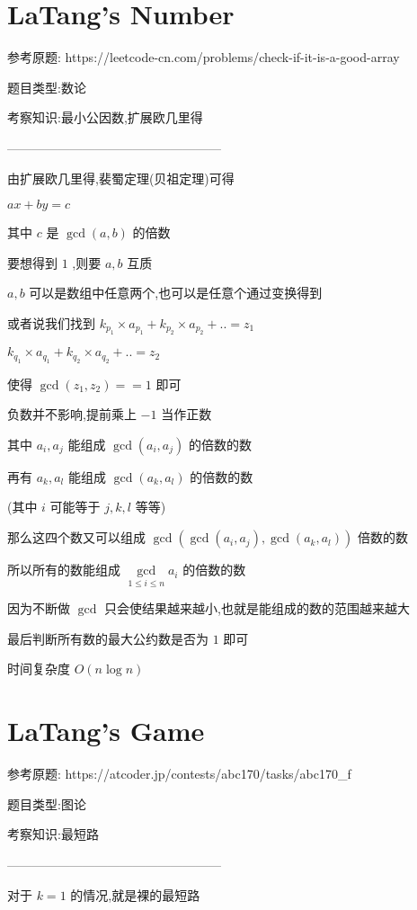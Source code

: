 \documentclass[UTF8]{ctexart}
\begin{document}
\newpage
\section{LaTang's Number}

参考原题: https://leetcode-cn.com/problems/check-if-it-is-a-good-array

题目类型:数论

考察知识:最小公因数,扩展欧几里得

---------------------------------------------------

由扩展欧几里得,裴蜀定理(贝祖定理)可得

$ax+by=c$

其中 $c$ 是 $\gcd(a,b)$ 的倍数

要想得到 $1$ ,则要 $a, b$ 互质

$a, b$ 可以是数组中任意两个,也可以是任意个通过变换得到

或者说我们找到 $k_{p_1}\times a_{p_1}+k_{p_2}\times a_{p_2}+.. = z_1$

$k_{q_1}\times a_{q_1}+k_{q_2}\times a_{q_2}+.. = z_2$

使得 $\gcd(z_1, z_2) == 1$ 即可

负数并不影响,提前乘上 $-1$ 当作正数

其中 $a_i, a_j$ 能组成 $\gcd(a_i, a_j)$ 的倍数的数

再有 $a_k, a_l$ 能组成 $\gcd(a_k, a_l)$ 的倍数的数

(其中 $i$ 可能等于 $j, k, l$ 等等)

那么这四个数又可以组成 $\gcd(\gcd(a_i, a_j),\gcd(a_k,a_l))$ 倍数的数

所以所有的数能组成 $\gcd\limits_{1 \leq i \leq n} a_i$ 的倍数的数

因为不断做 $\gcd$ 只会使结果越来越小,也就是能组成的数的范围越来越大

最后判断所有数的最大公约数是否为 $1$ 即可

时间复杂度 $O(n\log n)$

\newpage
\section{LaTang's Game}

参考原题: https://atcoder.jp/contests/abc170/tasks/abc170\_f

题目类型:图论

考察知识:最短路

---------------------------------------------------

对于 $k=1$ 的情况,就是裸的最短路
\end{document}
